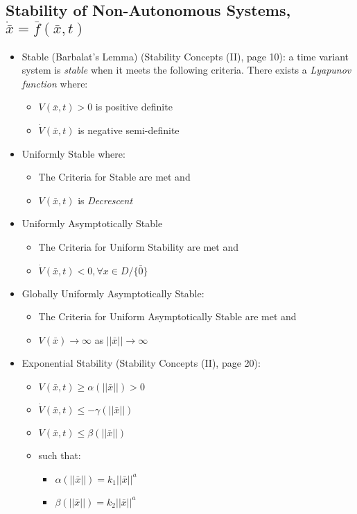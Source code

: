 \documentclass[12pt]{article}
\begin{document}
\subsection*{Stability of Non-Autonomous Systems, $\dot{\bar{x}}=\bar{f}(\bar{x},t)$}
\begin{itemize}
\item Stable (Barbalat's Lemma) (Stability Concepts (II), page 10): a time variant system is {\em stable} when it meets the following criteria. There exists a {\em Lyapunov function} where:
	\begin{itemize}
	\item $V(\bar{x},t)>0$ is positive definite
	\item $\dot{V}(\bar{x},t)$ is negative semi-definite 
	\end{itemize}
\item Uniformly Stable where:
	\begin{itemize}
	\item The Criteria for Stable are met and
	\item $V(\bar{x},t)$ is {\em Decrescent}
	\end{itemize}
\item Uniformly Asymptotically Stable
	\begin{itemize}
	\item The Criteria for Uniform Stability are met and
	\item $\dot{V}(\bar{x},t)<0,\forall x \in D/\{\bar{0}\}$
	\end{itemize}
\item Globally Uniformly Asymptotically Stable:
	\begin{itemize}
	\item The Criteria for Uniform Asymptotically Stable are met and
	\item $V(\bar{x})\to\infty$ as $||\bar{x}||\to\infty$
	\end{itemize}
\item Exponential Stability (Stability Concepts (II), page 20):
	\begin{itemize}
	\item $V(\bar{x},t)\geq\alpha(||\bar{x}||)>0$
	\item $\dot{V}(\bar{x},t)\leq-\gamma(||\bar{x}||)$
	\item $V(\bar{x},t)\leq\beta(||\bar{x}||)$
	\item such that:
		\begin{itemize}
		\item $\alpha(||\bar{x}||)=k_1||\bar{x}||^a$
		\item $\beta(||\bar{x}||)=k_2||\bar{x}||^a$

\end{itemize}
\end{itemize}
\end{itemize}
\end{document}
